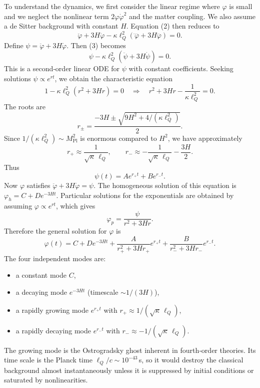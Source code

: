 \documentclass[11pt,a4paper]{article}
\begin{document}
To understand the dynamics, we first consider the linear regime where \(\varphi\) is small and we neglect the nonlinear term \(2\varphi\dot\varphi^2\) and the matter coupling. We also assume a de Sitter background with constant \(H\). Equation (2) then reduces to
\begin{equation}
\ddot\varphi + 3H\dot\varphi - \kappa\ell_Q^2 \left( \ddddot\varphi + 3H \dddot\varphi \right) = 0. \tag{3}
\end{equation}
Define \(\psi = \ddot\varphi + 3H\dot\varphi\). Then (3) becomes
\begin{equation}
\psi - \kappa\ell_Q^2 \left( \ddot\psi + 3H\dot\psi \right) = 0.
\end{equation}
This is a second‑order linear ODE for \(\psi\) with constant coefficients. Seeking solutions \(\psi \propto e^{rt}\), we obtain the characteristic equation
\begin{equation}
1 - \kappa\ell_Q^2 (r^2 + 3H r) = 0 \quad \Rightarrow \quad r^2 + 3H r - \frac{1}{\kappa\ell_Q^2} = 0.
\end{equation}
The roots are
\begin{equation}
r_\pm = \frac{-3H \pm \sqrt{9H^2 + 4/(\kappa\ell_Q^2)}}{2}.
\end{equation}
Since \(1/(\kappa\ell_Q^2) \sim M_{\mathrm{Pl}}^2\) is enormous compared to \(H^2\), we have approximately
\begin{equation}
r_+ \approx \frac{1}{\sqrt{\kappa}\,\ell_Q}, \qquad r_- \approx -\frac{1}{\sqrt{\kappa}\,\ell_Q} - \frac{3H}{2}.
\end{equation}
Thus
\begin{equation}
\psi(t) = A e^{r_+ t} + B e^{r_- t}.
\end{equation}
Now \(\varphi\) satisfies \(\ddot\varphi + 3H\dot\varphi = \psi\). The homogeneous solution of this equation is \(\varphi_h = C + D e^{-3Ht}\). Particular solutions for the exponentials are obtained by assuming \(\varphi \propto e^{r t}\), which gives
\begin{equation}
\varphi_p = \frac{\psi}{r^2 + 3H r}.
\end{equation}
Therefore the general solution for \(\varphi\) is
\begin{equation}
\varphi(t) = C + D e^{-3Ht} + \frac{A}{r_+^2 + 3H r_+} e^{r_+ t} + \frac{B}{r_-^2 + 3H r_-} e^{r_- t}. \tag{4}
\end{equation}
The four independent modes are:
\begin{itemize}
  \item a constant mode \(C\),
  \item a decaying mode \(e^{-3Ht}\) (timescale \(\sim 1/(3H)\)),
  \item a rapidly growing mode \(e^{r_+ t}\) with \(r_+ \approx 1/(\sqrt{\kappa}\,\ell_Q)\),
  \item a rapidly decaying mode \(e^{r_- t}\) with \(r_- \approx -1/(\sqrt{\kappa}\,\ell_Q)\).
\end{itemize}
The growing mode is the Ostrogradsky ghost inherent in fourth‑order theories. Its time scale is the Planck time \(\ell_Q/c \sim 10^{-43}\) s, so it would destroy the classical background almost instantaneously unless it is suppressed by initial conditions or saturated by nonlinearities.
\end{document}
